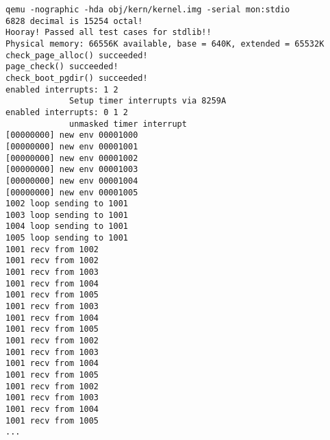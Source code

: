 \documentclass{article}
\begin{document}
\begin{CJK*}{UTF8}{gkai}
\begin{lstlisting}[style=console]
qemu -nographic -hda obj/kern/kernel.img -serial mon:stdio
6828 decimal is 15254 octal!
Hooray! Passed all test cases for stdlib!!
Physical memory: 66556K available, base = 640K, extended = 65532K
check_page_alloc() succeeded!
page_check() succeeded!
check_boot_pgdir() succeeded!
enabled interrupts: 1 2
             Setup timer interrupts via 8259A
enabled interrupts: 0 1 2
             unmasked timer interrupt
[00000000] new env 00001000
[00000000] new env 00001001
[00000000] new env 00001002
[00000000] new env 00001003
[00000000] new env 00001004
[00000000] new env 00001005
1002 loop sending to 1001
1003 loop sending to 1001
1004 loop sending to 1001
1005 loop sending to 1001
1001 recv from 1002
1001 recv from 1002
1001 recv from 1003
1001 recv from 1004
1001 recv from 1005
1001 recv from 1003
1001 recv from 1004
1001 recv from 1005
1001 recv from 1002
1001 recv from 1003
1001 recv from 1004
1001 recv from 1005
1001 recv from 1002
1001 recv from 1003
1001 recv from 1004
1001 recv from 1005
...
\end{lstlisting}


\clearpage

\end{CJK*}
\end{document}
